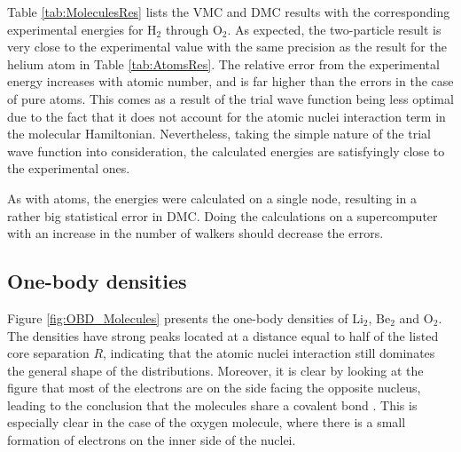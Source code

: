 Table \ref{tab:MoleculesRes} lists the VMC and DMC results with the corresponding experimental energies for $\mathrm{H_2}$ through $\mathrm{O_2}$. As expected, the two-particle result is very close to the experimental value with the same precision as the result for the helium atom in Table \ref{tab:AtomsRes}. The relative error from the experimental energy increases with atomic number, and is far higher than the errors in the case of pure atoms. This comes as a result of the trial wave function being less optimal due to the fact that it does not account for the atomic nuclei interaction term in the molecular Hamiltonian. Nevertheless, taking the simple nature of the trial wave function into consideration, the calculated energies are satisfyingly close to the experimental ones. 

As with atoms, the energies were calculated on a single node, resulting in a rather big statistical error in DMC. Doing the calculations on a supercomputer with an increase in the number of walkers should decrease the errors.

\subsection{One-body densities}

Figure \ref{fig:OBD_Molecules} presents the one-body densities of $\mathrm{Li_2}$, $\mathrm{Be_2}$ and $\mathrm{O_2}$. The densities have strong peaks located at a distance equal to half of the listed core separation $R$, indicating that the atomic nuclei interaction still dominates the general shape of the distributions. Moreover, it is clear by looking at the figure that most of the electrons are on the side facing the opposite nucleus, leading to the conclusion that the molecules share a covalent bond \cite{UniversityPhysics}. This is especially clear in the case of the oxygen molecule, where there is a small formation of electrons on the inner side of the nuclei.

